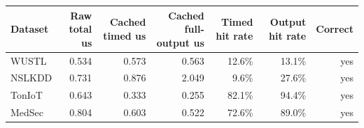 \begin{tabular}{lrrrrrr}
\toprule
Dataset & Raw total us & Cached timed us & Cached full-output us & Timed hit rate & Output hit rate & Correct \\
\midrule
WUSTL & 0.534 & 0.573 & 0.563 & 12.6\% & 13.1\% & yes \\
NSLKDD & 0.731 & 0.876 & 2.049 & 9.6\% & 27.6\% & yes \\
TonIoT & 0.643 & 0.333 & 0.255 & 82.1\% & 94.4\% & yes \\
MedSec & 0.804 & 0.603 & 0.522 & 72.6\% & 89.0\% & yes \\
\bottomrule
\end{tabular}
